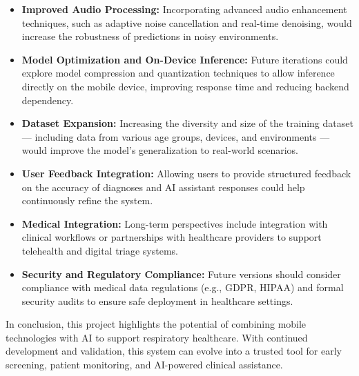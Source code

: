 \begin{itemize}
  \item \textbf{Improved Audio Processing:} Incorporating advanced audio enhancement techniques, such as adaptive noise cancellation and real-time denoising, would increase the robustness of predictions in noisy environments.
  
  \item \textbf{Model Optimization and On-Device Inference:} Future iterations could explore model compression and quantization techniques to allow inference directly on the mobile device, improving response time and reducing backend dependency.

  \item \textbf{Dataset Expansion:} Increasing the diversity and size of the training dataset — including data from various age groups, devices, and environments — would improve the model’s generalization to real-world scenarios.

  \item \textbf{User Feedback Integration:} Allowing users to provide structured feedback on the accuracy of diagnoses and AI assistant responses could help continuously refine the system.

  \item \textbf{Medical Integration:} Long-term perspectives include integration with clinical workflows or partnerships with healthcare providers to support telehealth and digital triage systems.

  \item \textbf{Security and Regulatory Compliance:} Future versions should consider compliance with medical data regulations (e.g., GDPR, HIPAA) and formal security audits to ensure safe deployment in healthcare settings.
\end{itemize}

In conclusion, this project highlights the potential of combining mobile technologies with AI to support respiratory healthcare. With continued development and validation, this system can evolve into a trusted tool for early screening, patient monitoring, and AI-powered clinical assistance.
